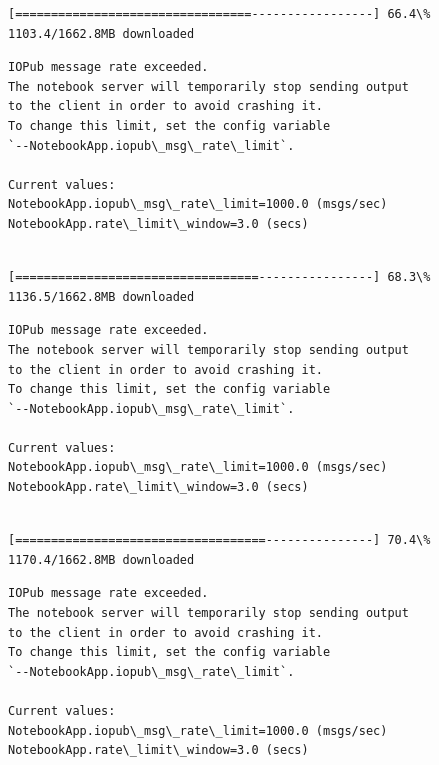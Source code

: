 \documentclass[11pt]{article}
\begin{document}
    \begin{Verbatim}[commandchars=\\\{\}]
[=================================-----------------] 66.4\% 1103.4/1662.8MB downloaded
    \end{Verbatim}

    \begin{Verbatim}[commandchars=\\\{\}]
IOPub message rate exceeded.
The notebook server will temporarily stop sending output
to the client in order to avoid crashing it.
To change this limit, set the config variable
`--NotebookApp.iopub\_msg\_rate\_limit`.

Current values:
NotebookApp.iopub\_msg\_rate\_limit=1000.0 (msgs/sec)
NotebookApp.rate\_limit\_window=3.0 (secs)


    \end{Verbatim}

    \begin{Verbatim}[commandchars=\\\{\}]
[==================================----------------] 68.3\% 1136.5/1662.8MB downloaded
    \end{Verbatim}

    \begin{Verbatim}[commandchars=\\\{\}]
IOPub message rate exceeded.
The notebook server will temporarily stop sending output
to the client in order to avoid crashing it.
To change this limit, set the config variable
`--NotebookApp.iopub\_msg\_rate\_limit`.

Current values:
NotebookApp.iopub\_msg\_rate\_limit=1000.0 (msgs/sec)
NotebookApp.rate\_limit\_window=3.0 (secs)


    \end{Verbatim}

    \begin{Verbatim}[commandchars=\\\{\}]
[===================================---------------] 70.4\% 1170.4/1662.8MB downloaded
    \end{Verbatim}

    \begin{Verbatim}[commandchars=\\\{\}]
IOPub message rate exceeded.
The notebook server will temporarily stop sending output
to the client in order to avoid crashing it.
To change this limit, set the config variable
`--NotebookApp.iopub\_msg\_rate\_limit`.

Current values:
NotebookApp.iopub\_msg\_rate\_limit=1000.0 (msgs/sec)
NotebookApp.rate\_limit\_window=3.0 (secs)


    \end{Verbatim}
\end{document}
